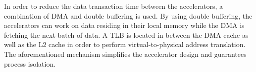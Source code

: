 In order to reduce the data transaction time between the accelerators, a
combination of DMA and double buffering is used. 
By using double buffering, the accelerators can work on data residing in
their local memory while the DMA is fetching the next batch of data. A
TLB is located in between the DMA cache as well as the L2 cache in order to perform
virtual-to-physical address translation. The aforementioned mechanism simplifies the
accelerator design and guarantees process isolation.
